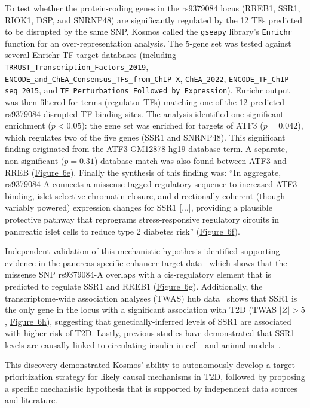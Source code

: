 \documentclass{article}
\begin{document}
To test whether the protein-coding genes in the rs9379084 locus (RREB1, SSR1, RIOK1, DSP, and SNRNP48) are significantly regulated by the 12 TFs predicted to be disrupted by the same SNP, Kosmos called the \texttt{gseapy} library's \texttt{Enrichr} function for an over-representation analysis. The 5-gene set was tested against several Enrichr TF-target databases (including \texttt{TRRUST\_Transcription\_Factors\_2019}, \texttt{ENCODE\_and\_ChEA\_Consensus\_TFs\_from\_ChIP-X}, \texttt{ChEA\_2022}, \texttt{ENCODE\_TF\_ChIP-seq\_2015}, and \texttt{TF\_Perturbations\_Followed\_by\_Expression}). Enrichr output was then filtered for terms (regulator TFs) matching one of the 12 predicted rs9379084-disrupted TF binding sites. The analysis identified one significant enrichment ($p < 0.05$): the gene set was enriched for targets of ATF3 ($p=0.042$), which regulates two of the five genes (SSR1 and SNRNP48). This significant finding originated from the ATF3 GM12878 hg19 database term. A separate, non-significant ($p=0.31$) database match was also found between ATF3 and RREB (\hyperref[fig:fig6]{Figure~6e}). Finally the synthesis of this finding was: ``In aggregate, rs9379084-A connects a missense-tagged regulatory sequence to increased ATF3 binding, islet-selective chromatin closure, and directionally coherent (though variably powered) expression changes for SSR1 [...], providing a plausible protective pathway that reprograms stress-responsive regulatory circuits in pancreatic islet cells to reduce type 2 diabetes risk'' (\hyperref[fig:fig6]{Figure~6f}). 

Independent validation of this mechanistic hypothesis identified supporting evidence in the pancreas-specific enhancer-target data~\cite{gschwind_encyclopedia_2023} which shows that the missense SNP rs9379084-A overlaps with a cis-regulatory element that is predicted to regulate SSR1 and RREB1 (\hyperref[fig:fig6]{Figure~6g}). Additionally, the transcriptome-wide association analyses (TWAS) hub data~\cite{gusev_integrative_2016} shows that SSR1 is the only gene in the locus with a significant association with T2D (TWAS $|Z| > 5$, \hyperref[fig:fig6]{Figure~6h}), suggesting that genetically-inferred levels of SSR1 are associated with higher risk of T2D. Lastly, previous studies have demonstrated that SSR1 levels are causally linked to circulating insulin in cell~\cite{huang_deficient_2021} and animal models~\cite{li_trap_2025}. 

This discovery demonstrated Kosmos' ability to autonomously develop a target prioritization strategy for likely causal mechanisms in T2D, followed by proposing a specific mechanistic hypothesis that is supported by independent data sources and literature.
\end{document}

